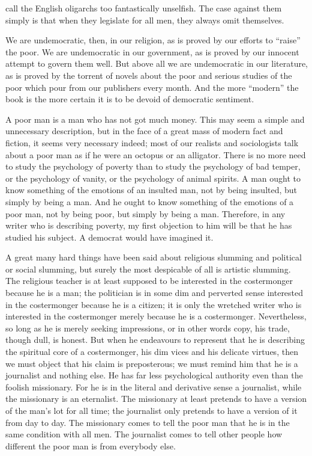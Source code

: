 call the English oligarchs too fantastically unselfish. The case against them simply is that when they legislate for all men, they always omit themselves.

We are undemocratic, then, in our religion, as is proved by our efforts to “raise” the poor. We are undemocratic in our government, as is proved by our innocent attempt to govern them well. But above all we are undemocratic in our literature, as is proved by the torrent of novels about the poor and serious studies of the poor which pour from our publishers every month. And the more “modern” the book is the more certain it is to be devoid of democratic sentiment.

A poor man is a man who has not got much money. This may seem a simple and unnecessary description, but in the face of a great mass of modern fact and fiction, it seems very necessary indeed; most of our realists and sociologists talk about a poor man as if he were an octopus or an alligator. There is no more need to study the psychology of poverty than to study the psychology of bad temper, or the psychology of vanity, or the psychology of animal spirits. A man ought to know something of the emotions of an insulted man, not by being insulted, but simply by being a man. And he ought to know something of the emotions of a poor man, not by being poor, but simply by being a man. Therefore, in any writer who is describing poverty, my first objection to him will be that he has studied his subject. A democrat would have imagined it.

A great many hard things have been said about religious slumming and political or social slumming, but surely the most despicable of all is artistic slumming. The religious teacher is at least supposed to be interested in the costermonger because he is a man; the politician is in some dim and perverted sense interested in the costermonger because he is a citizen; it is only the wretched writer who is interested in the costermonger merely because he is a costermonger. Nevertheless, so long as he is merely seeking impressions, or in other words copy, his trade, though dull, is honest. But when he endeavours to represent that he is describing the spiritual core of a costermonger, his dim vices and his delicate virtues, then we must object that his claim is preposterous; we must remind him that he is a journalist and nothing else. He has far less psychological authority even than the foolish missionary. For he is in the literal and derivative sense a journalist, while the missionary is an eternalist. The missionary at least pretends to have a version of the man’s lot for all time; the journalist only pretends to have a version of it from day to day. The missionary comes to tell the poor man that he is in the same condition with all men. The journalist comes to tell other people how different the poor man is from everybody else.


